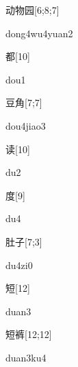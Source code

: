 \begin{verbete}{动物园}[6;8;7]
\begin{pronuncia}{dong4wu4yuan2}
\end{pronuncia}
\end{verbete}

\begin{verbete}[dou1]{都}[10]
\begin{pronuncia}{dou1}
\end{pronuncia}
\end{verbete}

\begin{verbete}{豆角}[7;7]
\begin{pronuncia}{dou4jiao3}
\end{pronuncia}
\end{verbete}

\begin{verbete}[du2]{读}[10]
\begin{pronuncia}{du2}
\end{pronuncia}
\end{verbete}

\begin{verbete}[du4]{度}[9]
\begin{pronuncia}{du4}
\end{pronuncia}
\end{verbete}

\begin{verbete}[du4zi0]{肚子}[7;3]
\begin{pronuncia}{du4zi0}
\end{pronuncia}
\end{verbete}

\begin{verbete}[duan3]{短}[12]
\begin{pronuncia}{duan3}
\end{pronuncia}
\end{verbete}

\begin{verbete}[duan3ku4]{短裤}[12;12]
\begin{pronuncia}{duan3ku4}
\end{pronuncia}
\end{verbete}

